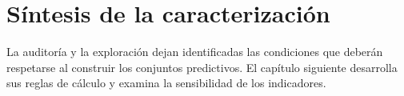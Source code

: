 \section{Síntesis de la caracterización}
La auditoría y la exploración dejan identificadas las condiciones que deberán respetarse al construir los conjuntos predictivos. El capítulo siguiente desarrolla sus reglas de cálculo y examina la sensibilidad de los indicadores.


